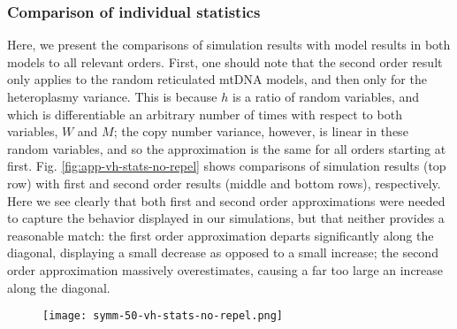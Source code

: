 \documentclass{article}
\begin{document}
\begin{appendices}
\subsubsection{Comparison of individual statistics}
Here, we present the comparisons of simulation results with model results in both models to all relevant orders. First, one should note that the second order result only applies to the random reticulated mtDNA models, and then only for the heteroplasmy variance. This is because $h$ is a ratio of random variables, and which is differentiable an arbitrary number of times with respect to both variables, $W$ and $M$; the copy number variance, however, is linear in these random variables, and so the approximation is the same for all orders starting at first. Fig. \ref{fig:app-vh-stats-no-repel} shows comparisons of simulation results (top row) with first and second order results (middle and bottom rows), respectively. Here we see clearly that both first and second order approximations were needed to capture the behavior displayed in our simulations, but that neither provides a reasonable match: the first order approximation departs significantly along the diagonal, displaying a small decrease as opposed to a small increase; the second order approximation massively overestimates, causing a far too large an increase along the diagonal.%
\begin{figure}[!ht]
        \centering \texttt{[image: symm-50-vh-stats-no-repel.png]}

\end{figure}
\end{appendices}
\end{document}
